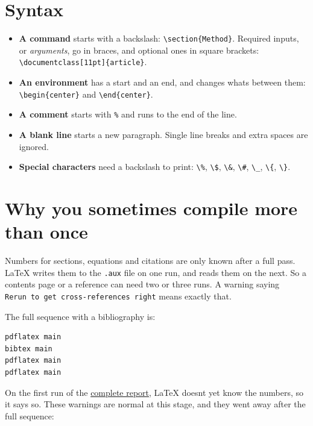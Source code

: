 \section{Syntax}\label{syntax}

\begin{itemize}
\tightlist
\item
  \textbf{A command} starts with a backslash: \texttt{\textbackslash{}section\{Method\}}. Required inputs, or \emph{arguments}, go in braces, and optional ones in square brackets: \texttt{\textbackslash{}documentclass{[}11pt{]}\{article\}}.
\item
  \textbf{An environment} has a start and an end, and changes what\textquotesingle s between them: \texttt{\textbackslash{}begin\{center\}} and \texttt{\textbackslash{}end\{center\}}.
\item
  \textbf{A comment} starts with \texttt{\%} and runs to the end of the line.
\item
  \textbf{A blank line} starts a new paragraph. Single line breaks and extra spaces are ignored.
\item
  \textbf{Special characters} need a backslash to print: \texttt{\textbackslash{}\%}, \texttt{\textbackslash{}\$}, \texttt{\textbackslash{}\&}, \texttt{\textbackslash{}\#}, \texttt{\textbackslash{}\_}, \texttt{\textbackslash{}\{}, \texttt{\textbackslash{}\}}.
\end{itemize}

\section{Why you sometimes compile more than once}\label{why-you-sometimes-compile-more-than-once}

Numbers for sections, equations and citations are only known after a full pass. LaTeX writes them to the \texttt{.aux} file on one run, and reads them on the next. So a contents page or a reference can need two or three runs. A warning saying \texttt{Rerun\ to\ get\ cross-references\ right} means exactly that.

The full sequence with a bibliography is:

\begin{lstlisting}[language=bash]
pdflatex main
bibtex main
pdflatex main
pdflatex main
\end{lstlisting}

On the first run of the \href{../references/}{complete report}, LaTeX doesn\textquotesingle t yet know the numbers, so it says so. These warnings are normal at this stage, and they went away after the full sequence:

